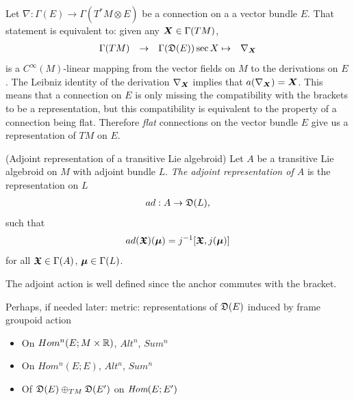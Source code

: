 \begin{example}
Let $\nabla: \Gamma(E) \to \Gamma(T^*M \otimes E)$ be a connection on a a vector bundle $E$. That statement is equivalent to: given any $\bm{X} \in \Gamma(TM)$,
\begin{align*}
    \Gamma(TM) && \to && \Gamma(\mathfrak{D}(E))
    \sec X &\mapsto& \nabla_{\bm{X}}
\end{align*}
is a $C^\infty(M)$-linear mapping from the vector fields on $M$ to the derivations on $E$. The Leibniz identity of the derivation $\nabla_{\bm{X}}$ implies that $a(\nabla_{\bm{X}}) = \bm{X}$. This means that a connection on $E$ is only missing the compatibility with the brackets to be a representation, but this compatibility is equivalent to the property of a connection being flat. Therefore \emph{flat} connections on the vector bundle $E$ give us a representation of $TM$ on $E$.
\end{example}

\begin{definition}(Adjoint representation of a transitive Lie algebroid)\label{defnAdjointAct}
Let $A$ be a transitive Lie algebroid on $M$ with adjoint bundle $L$. \emph{The adjoint representation of $A$} is the representation on $L$
\begin{align*}
    ad: A \to \mathfrak{D}(L), 
\end{align*}
such that
\begin{align*}
     ad(\bm{\mathfrak{X}})(\bm{\mu}) = j^{-1}[\bm{\mathfrak{X}}, j(\bm{\mu})]
\end{align*}
for all $\bm{\mathfrak{X}} \in \Gamma(A)$, $\bm{\mu} \in \Gamma(L)$.
\end{definition}
The adjoint action is well defined since the anchor commutes with the bracket.

Perhaps, if needed later: metric: representations of $\mathfrak{D}(E)$ induced by frame groupoid action
    \begin{itemize}
    
    \item On $Hom^n(E; M \times \mathbb{R})$, $Alt^n$, $Sum^n$
    
    \item On $Hom^n(E; E)$, $Alt^n$, $Sum^n$
    
    \item Of $\mathfrak{D}(E)\oplus_{TM} \mathfrak{D}(E')$ on $\operatorname{\textit{Hom}}(E; E')$
    
    \end{itemize}



